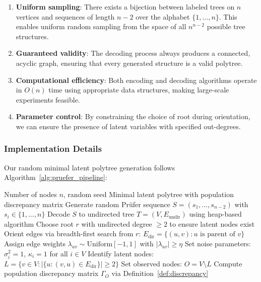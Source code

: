 \documentclass[11pt,a4paper]{article}
\numberwithin{equation}{section}
\begin{document}
\begin{enumerate}[label=(\roman*)]
\item \textbf{Uniform sampling}: There exists a bijection between labeled trees on $n$ vertices and sequences of length $n-2$ over the alphabet $\{1,\ldots,n\}$. This enables uniform random sampling from the space of all $n^{n-2}$ possible tree structures.

\item \textbf{Guaranteed validity}: The decoding process always produces a connected, acyclic graph, ensuring that every generated structure is a valid polytree.

\item \textbf{Computational efficiency}: Both encoding and decoding algorithms operate in $O(n)$ time using appropriate data structures, making large-scale experiments feasible.

\item \textbf{Parameter control}: By constraining the choice of root during orientation, we can ensure the presence of latent variables with specified out-degrees.
\end{enumerate}

\subsubsection{Implementation Details}

Our random minimal latent polytree generation follows Algorithm~\ref{alg:pruefer_pipeline}:

\begin{algorithm}[H]
\caption{Prüfer-Based Population Random Polytree Generation}
\label{alg:pruefer_pipeline}
\begin{algorithmic}[1]
    \Require Number of nodes $n$, random seed
    \Ensure Minimal latent polytree with population discrepancy matrix
    \State Generate random Prüfer sequence $S = (s_1, \ldots, s_{n-2})$ with $s_i \in \{1,\ldots,n\}$
    \State Decode $S$ to undirected tree $T = (V, E_{\text{undir}})$ using heap-based algorithm
    \State Choose root $r$ with undirected degree $\geq 2$ to ensure latent nodes exist
    \State Orient edges via breadth-first search from $r$: $E_{\text{dir}} = \{(u,v) : u \text{ is parent of } v\}$
    \State Assign edge weights $\lambda_{uv} \sim \text{Uniform}[-1,1]$ with $|\lambda_{uv}| \geq \eta$
    \State Set noise parameters: $\sigma_i^2 = 1$, $\kappa_i = 1$ for all $i \in V$
    \State Identify latent nodes: $L = \{v \in V : |\{u : (v,u) \in E_{\text{dir}}\}| \geq 2\}$
    \State Set observed nodes: $O = V \setminus L$
    \State Compute population discrepancy matrix $\Gamma_O$ via Definition~\ref{def:discrepancy}
\end{algorithmic}
\end{algorithm}
\end{document}
